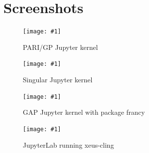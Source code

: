 \documentclass{deliverablereport}
\begin{document}

\appendix
\section{Screenshots}
\newcommand{\screenshot}[2]{
\begin{figure}[ht]
  \texttt{[image: \#1]}
  \caption{#2}
\end{figure}}

\screenshot{pari.png}{PARI/GP Jupyter kernel}
\screenshot{singular_new.png}{Singular Jupyter kernel}
\clearpage
\screenshot{gap.png}{GAP Jupyter kernel with package francy}
\screenshot{cling.png}{JupyterLab running xeus-cling}
\end{document}

